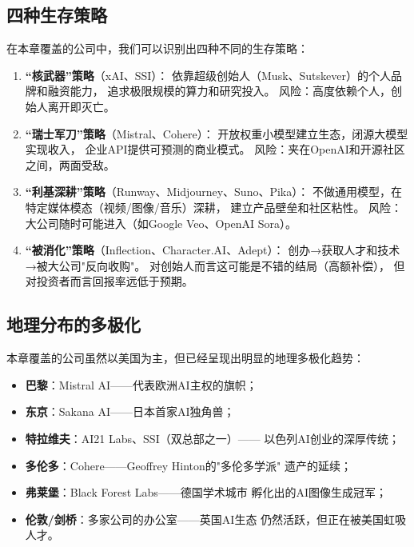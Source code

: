 \subsection{四种生存策略}

在本章覆盖的公司中，我们可以识别出四种不同的生存策略：

\begin{keybox}[AI创业公司的四种生存策略]
\begin{enumerate}
  \item \textbf{``核武器''策略}（xAI、SSI）：
    依靠超级创始人（Musk、Sutskever）的个人品牌和融资能力，
    追求极限规模的算力和研究投入。
    风险：高度依赖个人，创始人离开即灭亡。

  \item \textbf{``瑞士军刀''策略}（Mistral、Cohere）：
    开放权重小模型建立生态，闭源大模型实现收入，
    企业API提供可预测的商业模式。
    风险：夹在OpenAI和开源社区之间，两面受敌。

  \item \textbf{``利基深耕''策略}（Runway、Midjourney、Suno、Pika）：
    不做通用模型，在特定媒体模态（视频/图像/音乐）深耕，
    建立产品壁垒和社区粘性。
    风险：大公司随时可能进入（如Google Veo、OpenAI Sora）。

  \item \textbf{``被消化''策略}（Inflection、Character.AI、Adept）：
    创办→获取人才和技术→被大公司"反向收购"。
    对创始人而言这可能是不错的结局（高额补偿），
    但对投资者而言回报率远低于预期。
\end{enumerate}
\end{keybox}

\subsection{地理分布的多极化}

本章覆盖的公司虽然以美国为主，但已经呈现出明显的地理多极化趋势：

\begin{itemize}
  \item \textbf{巴黎}：Mistral AI——代表欧洲AI主权的旗帜；
  \item \textbf{东京}：Sakana AI——日本首家AI独角兽；
  \item \textbf{特拉维夫}：AI21 Labs、SSI（双总部之一）——
    以色列AI创业的深厚传统；
  \item \textbf{多伦多}：Cohere——Geoffrey Hinton的"多伦多学派"
    遗产的延续；
  \item \textbf{弗莱堡}：Black Forest Labs——德国学术城市
    孵化出的AI图像生成冠军；
  \item \textbf{伦敦/剑桥}：多家公司的办公室——英国AI生态
    仍然活跃，但正在被美国虹吸人才。
\end{itemize}

